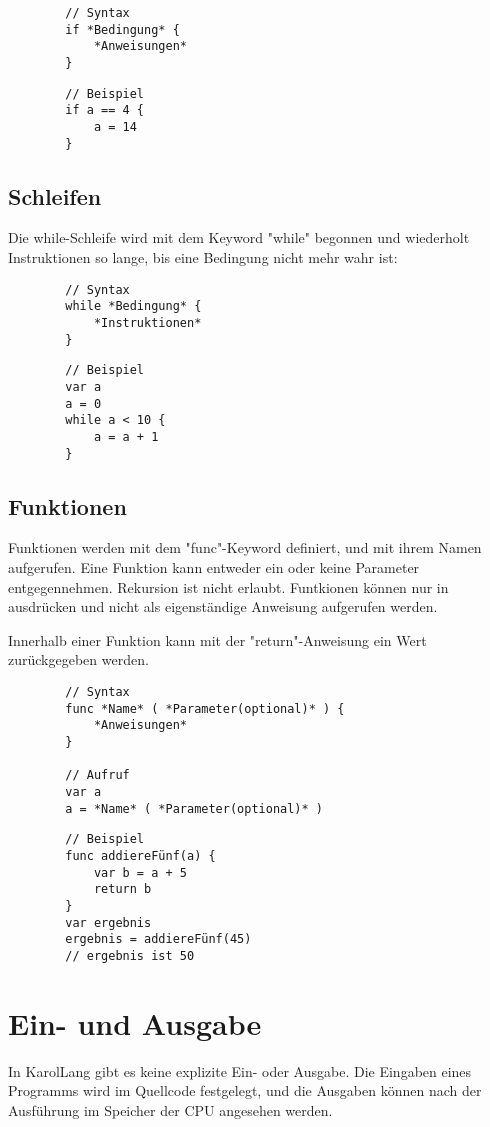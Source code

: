 \documentclass[ngerman]{article}
\begin{document}
    \begin{lstlisting}
        // Syntax
        if *Bedingung* {
            *Anweisungen*
        }
    \end{lstlisting}
    \begin{lstlisting}
        // Beispiel
        if a == 4 {
            a = 14
        }
    \end{lstlisting}

    \subsection{Schleifen}
    Die while-Schleife wird mit dem Keyword "while" begonnen und
    wiederholt Instruktionen so lange, bis eine Bedingung nicht
    mehr wahr ist:
    \begin{lstlisting}
        // Syntax
        while *Bedingung* {
            *Instruktionen*
        }
    \end{lstlisting}
    \begin{lstlisting}
        // Beispiel
        var a
        a = 0
        while a < 10 {
            a = a + 1
        }
    \end{lstlisting}

    \subsection{Funktionen}
    Funktionen werden mit dem "func"-Keyword definiert, und mit ihrem
    Namen aufgerufen. Eine Funktion kann entweder ein oder keine
    Parameter entgegennehmen. Rekursion ist nicht erlaubt.
    Funtkionen können nur in ausdrücken und nicht als 
    eigenständige Anweisung aufgerufen werden.

    Innerhalb einer Funktion kann mit der "return"-Anweisung ein
    Wert zurückgegeben werden.

    \begin{lstlisting}
        // Syntax
        func *Name* ( *Parameter(optional)* ) {
            *Anweisungen*
        }
        
        // Aufruf
        var a
        a = *Name* ( *Parameter(optional)* )
    \end{lstlisting}
    \begin{lstlisting}
        // Beispiel
        func addiereFünf(a) {
            var b = a + 5
            return b
        }
        var ergebnis
        ergebnis = addiereFünf(45)
        // ergebnis ist 50
    \end{lstlisting}

    \section{Ein- und Ausgabe}
    In KarolLang gibt es keine explizite Ein- oder Ausgabe.
    Die Eingaben eines Programms wird im Quellcode festgelegt, und
    die Ausgaben können nach der Ausführung im Speicher der
    CPU angesehen werden.
\end{document}
